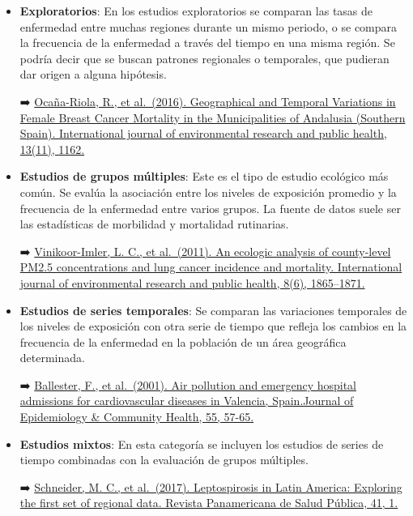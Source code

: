 \documentclass[
  spanish,
  a4paper,
]{scrbook}
\begin{document}
\begin{itemize}
\item
  \textbf{Exploratorios}: En los estudios exploratorios se comparan las
  tasas de enfermedad entre muchas regiones durante un mismo periodo, o
  se compara la frecuencia de la enfermedad a través del tiempo en una
  misma región. Se podría decir que se buscan patrones regionales o
  temporales, que pudieran dar origen a alguna hipótesis.

  ➡️
  \href{https://www.ncbi.nlm.nih.gov/pmc/articles/PMC5129372/}{Ocaña-Riola,
  R., et al.~(2016). Geographical and Temporal Variations in Female
  Breast Cancer Mortality in the Municipalities of Andalusia (Southern
  Spain). International journal of environmental research and public
  health, 13(11), 1162.}
\item
  \textbf{Estudios de grupos múltiples}: Este es el tipo de estudio
  ecológico más común. Se evalúa la asociación entre los niveles de
  exposición promedio y la frecuencia de la enfermedad entre varios
  grupos. La fuente de datos suele ser las estadísticas de morbilidad y
  mortalidad rutinarias.

  ➡️
  \href{https://www.ncbi.nlm.nih.gov/pmc/articles/PMC3138001/}{Vinikoor-Imler,
  L. C., et al.~(2011). An ecologic analysis of county-level PM2.5
  concentrations and lung cancer incidence and mortality. International
  journal of environmental research and public health, 8(6),
  1865--1871.}
\item
  \textbf{Estudios de series temporales}: Se comparan las variaciones
  temporales de los niveles de exposición con otra serie de tiempo que
  refleja los cambios en la frecuencia de la enfermedad en la población
  de un área geográfica determinada.

  ➡️ \href{https://jech.bmj.com/content/55/1/57.long}{Ballester, F., et
  al.~(2001). Air pollution and emergency hospital admissions for
  cardiovascular diseases in Valencia, Spain.Journal of Epidemiology \&
  Community Health, 55, 57-65.}
\item
  \textbf{Estudios mixtos}: En esta categoría se incluyen los estudios
  de series de tiempo combinadas con la evaluación de grupos múltiples.

  ➡️
  \href{https://www.ncbi.nlm.nih.gov/pmc/articles/PMC6645204/}{Schneider,
  M. C., et al.~(2017). Leptospirosis in Latin America: Exploring the
  first set of regional data. Revista Panamericana de Salud Pública, 41,
  1.}
\end{itemize}
\end{document}
